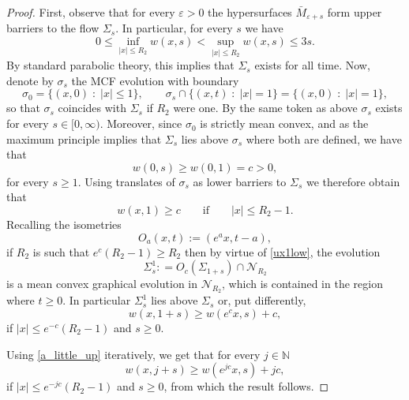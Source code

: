 \documentclass[leqno,11pt]{amsart}
\theoremstyle{definition}
\begin{document}
\begin{proof}
First, observe that for every $\varepsilon>0$ the hypersurfaces $\bar{M}_{\varepsilon+s}$ form upper barriers to the flow $\Sigma_s$. In particular, for every $s$ we have 
\begin{equation}
0 \leq \inf_{|x| \leq R_2}w(x,s)<\sup_{|x|\leq R_2}w(x,s) \leq 3s.
\end{equation}
By standard parabolic theory, this implies that $\Sigma_s$ exists for all time. 
Now, denote by $\sigma_s$ the MCF evolution with boundary 
\[
\sigma_{ 0}=\{(x,0)\;:\; |x|\leq 1\}, \qquad \sigma_s\cap \{(x,t)\;:\; |x|= 1\}= \{(x,0)\;:\; |x|=1\},
\]
so that $\sigma_s$ coincides with $\Sigma_s$ if $R_2$ were one. By the same token as above $\sigma_s$ exists for every $s\in [0,\infty)$. Moreover,  since $\sigma_0$ is strictly mean convex, { and as the maximum principle implies that $\Sigma_s$ lies above $\sigma_s$ where both are defined,}  we have that {
\begin{equation}
w(0,s)\geq w(0,1)=c>0, 
\end{equation}
for every $s\geq 1$.
}
Using translates of $\sigma_s$ as lower barriers to $\Sigma_s$ we therefore obtain that
\begin{equation}\label{ux1low}
w(x,1)\geq c\qquad \textrm{if}\qquad|x|\leq R_2-1. 
\end{equation}
Recalling the isometries
\begin{equation}\label{O_a_recall}
O_{a}(x,t):=(e^a x,t-a),
\end{equation}
if $R_2$ is such that { $e^{c}(R_2-1)\geq R_2$}   then by virtue of \eqref{ux1low}, the evolution
\begin{equation}
\Sigma^1_s{:}=O_c(\Sigma_{1+s})\cap \mathcal{N}_{R_2}
\end{equation}
is a mean convex graphical evolution in $\mathcal{N}_{R_2}$, which is contained in the region where $t\geq 0$. In particular $\Sigma^1_s$ lies above $\Sigma_s$ or, put differently,  
\begin{equation}\label{a_little_up}
w(x,1+s) \geq w(e^{c}x,s)+c,
\end{equation}
if { $|x| \leq e^{-c}(R_2-1)$ } and $s\geq 0$.

Using \eqref{a_little_up} iteratively, we get that for every $j\in \mathbb{N}$
\begin{equation}
w(x,j+s) \geq w(e^{jc}x,s)+jc,
\end{equation}
if { $|x| \leq e^{-jc}(R_2-1)$} and $s\geq 0$, from which the result follows.       
\end{proof}
\end{document}
